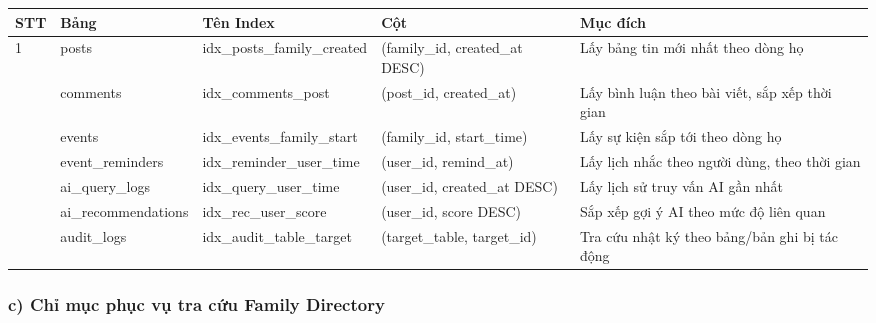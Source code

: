 \begin{small}
	\begin{longtable}{|>{\centering\arraybackslash}p{0.6cm}|>{\raggedright\arraybackslash}p{2.3cm}|>{\raggedright\arraybackslash}p{3.8cm}|>{\raggedright\arraybackslash}p{3.0cm}|>{\raggedright\arraybackslash}p{3.8cm}|}
		\hline
		\textbf{STT} & \textbf{Bảng} & \textbf{Tên Index} & \textbf{Cột} & \textbf{Mục đích} \\ \hline
		\endhead
		\hline
		\endfoot
		
				1
		& posts
		& idx\_\allowbreak posts\_\allowbreak family\_\allowbreak created
		& (family\_id, created\_at DESC)
		& Lấy bảng tin mới nhất theo dòng họ
		\\ \hline
		2
		& comments
		& idx\_\allowbreak comments\_\allowbreak post
		& (post\_id, created\_at)
		& Lấy bình luận theo bài viết,
		sắp xếp thời gian
		\\ \hline
		3
		& events
		& idx\_\allowbreak events\_\allowbreak family\_\allowbreak start
		& (family\_id, start\_time)
		& Lấy sự kiện sắp tới theo dòng họ
		\\ \hline
		4
		& event\_\allowbreak reminders
		& idx\_\allowbreak reminder\_\allowbreak user\_\allowbreak time
		& (user\_id, remind\_at)
		& Lấy lịch nhắc theo người dùng,
		theo thời gian
		\\ \hline
		5
		& ai\_\allowbreak query\_\allowbreak logs
		& idx\_\allowbreak query\_\allowbreak user\_\allowbreak time
		& (user\_id, created\_at DESC)
		& Lấy lịch sử truy vấn AI gần nhất
		\\ \hline
		6
		& ai\_\allowbreak recommendations
		& idx\_\allowbreak rec\_\allowbreak user\_\allowbreak score
		& (user\_id, score DESC)
		& Sắp xếp gợi ý AI theo mức độ liên quan
		\\ \hline
		7
		& audit\_\allowbreak logs
		& idx\_\allowbreak audit\_\allowbreak table\_\allowbreak target
		& (target\_table, target\_id)
		& Tra cứu nhật ký theo bảng/bản ghi
		bị tác động
		\\ \hline
	\end{longtable}
\end{small}

\subsubsection{c) Chỉ mục phục vụ tra cứu Family Directory}

\renewcommand{\arraystretch}{1.3}
\setlength{\tabcolsep}{3pt}

